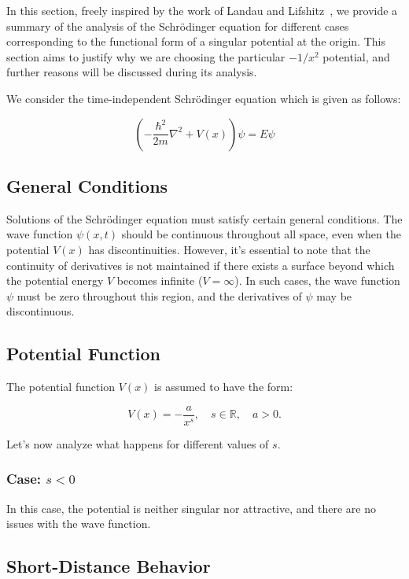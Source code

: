 In this section, freely inspired by the work of Landau and Lifshitz~\cite{landau1991quantum}, we provide a summary of the analysis of the Schrödinger equation for different cases corresponding to the functional form of a singular potential at the origin. This section aims to justify why we are choosing the particular $-1/x^2$ potential, and further reasons will be discussed during its analysis. 

We consider the time-independent Schrödinger equation which is given as follows:

\begin{equation*}
    \left(- \frac{\hbar^2}{2m}\nabla^2 + V(x) \right) \psi = E \psi
\end{equation*}

\subsection*{General Conditions}
Solutions of the Schrödinger equation must satisfy certain general conditions. The wave function \(\psi(x, t)\) should be continuous throughout all space, even when the potential \(V(x)\) has discontinuities. However, it's essential to note that the continuity of derivatives is not maintained if there exists a surface beyond which the potential energy \(V\) becomes infinite (\(V = \infty\)). In such cases, the wave function \(\psi\) must be zero throughout this region, and the derivatives of \(\psi\) may be discontinuous.

\clearpage

\subsection*{Potential Function}
The potential function \(V(x)\) is assumed to have the form:

\begin{equation*}
    V(x) = -\frac{a}{x^s}, \quad s \in \mathbb{R}, \quad a > 0.
\end{equation*}

\noindent
Let's now analyze what happens for different values of $s$.

\subsubsection{Case: \(s < 0\)}
In this case, the potential is neither singular nor attractive, and there are no issues with the wave function.

\subsection*{Short-Distance Behavior}

